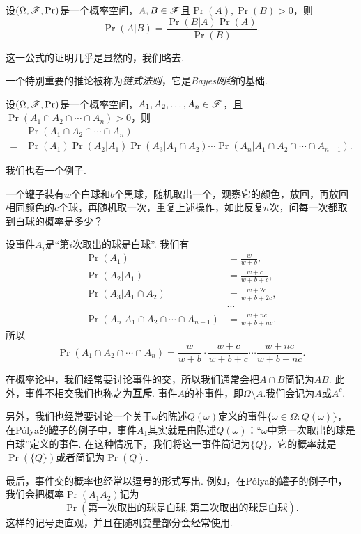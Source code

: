 \begin{theorem}[贝叶斯公式]\label{thm:bayes}
设$(\Omega,\mathscr{F},\Pr)$是一个概率空间，$A,B\in\mathscr{F}$且$\Pr(A),\Pr(B)>0$，则
\[
    \Pr(A|B) = \frac{\Pr(B|A)\Pr(A)}{\Pr(B)}.
\]
\end{theorem}

这一公式的证明几乎是显然的，我们略去. 

一个特别重要的推论被称为\emph{链式法则}，它是\emph{Bayes网络}的基础. 

\begin{corollary}[链式法则]\label{cor:chain-rule}
设$(\Omega,\mathscr{F},\Pr)$是一个概率空间，$A_1,A_2,\ldots,A_n\in\mathscr{F}$，且$\Pr(A_1\cap A_2\cap\cdots\cap A_n)>0$，则
\begin{align*}
    &\Pr(A_1\cap A_2\cap\cdots\cap A_n)\\
    = &\Pr(A_1)\Pr(A_2|A_1)\Pr(A_3|A_1\cap A_2)\cdots\Pr(A_n|A_1\cap A_2\cap\cdots\cap A_{n-1}).
\end{align*}
\end{corollary}

我们也看一个例子. 

\begin{example}[P\'olya的罐子]
    一个罐子装有$w$个白球和$b$个黑球，随机取出一个，观察它的颜色，放回，再放回相同颜色的$c$个球，再随机取一次，重复上述操作，如此反复$n$次，问每一次都取到白球的概率是多少？

    设事件$A_i$是“第$i$次取出的球是白球”. 我们有
\begin{align*}
    \Pr(A_1)&=\frac{w}{w+b},\\
    \Pr(A_2|A_1)&=\frac{w+c}{w+b+c},\\
    \Pr(A_3|A_1\cap A_2)&=\frac{w+2c}{w+b+2c},\\
    &\cdots\\
    \Pr(A_n|A_1\cap A_2\cap\cdots\cap A_{n-1})&=\frac{w+nc}{w+b+nc}.
\end{align*}
    所以
\[
    \Pr(A_1\cap A_2\cap\cdots\cap A_n) = \frac{w}{w+b}\cdot\frac{w+c}{w+b+c}\cdots\frac{w+nc}{w+b+nc}.
\]
\end{example}

\begin{remark}
    在概率论中，我们经常要讨论事件的交，所以我们通常会把$A\cap B$简记为$AB$. 此外，事件不相交我们也称之为\textbf{互斥}. 事件$A$的补事件，即$\Omega\setminus A$.我们会记为$\bar{A}$或$A^c$.
    
    另外，我们也经常要讨论一个关于$\omega$的陈述$Q(\omega)$定义的事件$\{\omega\in\Omega:Q(\omega)\}$，在P\'olya的罐子的例子中，事件$A_1$其实就是由陈述$Q(\omega)$：“$\omega$中第一次取出的球是白球”定义的事件. 在这种情况下，我们将这一事件简记为$\{Q\}$，它的概率就是$\Pr(\{Q\})$或者简记为$\Pr(Q)$. 
    
    最后，事件交的概率也经常以逗号的形式写出. 例如，在P\'olya的罐子的例子中，我们会把概率$\Pr(A_1A_2)$记为
    \[\Pr(\text{第一次取出的球是白球},\text{第二次取出的球是白球}).\] 
    这样的记号更直观，并且在随机变量部分会经常使用. 
\end{remark}

